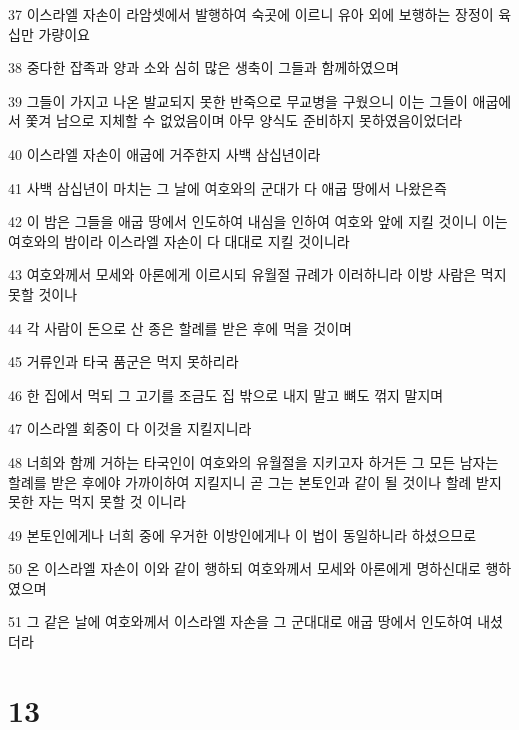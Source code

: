 \par 37 이스라엘 자손이 라암셋에서 발행하여 숙곳에 이르니 유아 외에 보행하는 장정이 육십만 가량이요
\par 38 중다한 잡족과 양과 소와 심히 많은 생축이 그들과 함께하였으며
\par 39 그들이 가지고 나온 발교되지 못한 반죽으로 무교병을 구웠으니 이는 그들이 애굽에서 쫓겨 남으로 지체할 수 없었음이며 아무 양식도 준비하지 못하였음이었더라
\par 40 이스라엘 자손이 애굽에 거주한지 사백 삼십년이라
\par 41 사백 삼십년이 마치는 그 날에 여호와의 군대가 다 애굽 땅에서 나왔은즉
\par 42 이 밤은 그들을 애굽 땅에서 인도하여 내심을 인하여 여호와 앞에 지킬 것이니 이는 여호와의 밤이라 이스라엘 자손이 다 대대로 지킬 것이니라
\par 43 여호와께서 모세와 아론에게 이르시되 유월절 규례가 이러하니라 이방 사람은 먹지 못할 것이나
\par 44 각 사람이 돈으로 산 종은 할례를 받은 후에 먹을 것이며
\par 45 거류인과 타국 품군은 먹지 못하리라
\par 46 한 집에서 먹되 그 고기를 조금도 집 밖으로 내지 말고 뼈도 꺾지 말지며
\par 47 이스라엘 회중이 다 이것을 지킬지니라
\par 48 너희와 함께 거하는 타국인이 여호와의 유월절을 지키고자 하거든 그 모든 남자는 할례를 받은 후에야 가까이하여 지킬지니 곧 그는 본토인과 같이 될 것이나 할례 받지 못한 자는 먹지 못할 것 이니라
\par 49 본토인에게나 너희 중에 우거한 이방인에게나 이 법이 동일하니라 하셨으므로
\par 50 온 이스라엘 자손이 이와 같이 행하되 여호와께서 모세와 아론에게 명하신대로 행하였으며
\par 51 그 같은 날에 여호와께서 이스라엘 자손을 그 군대대로 애굽 땅에서 인도하여 내셨더라

\chapter{13}


